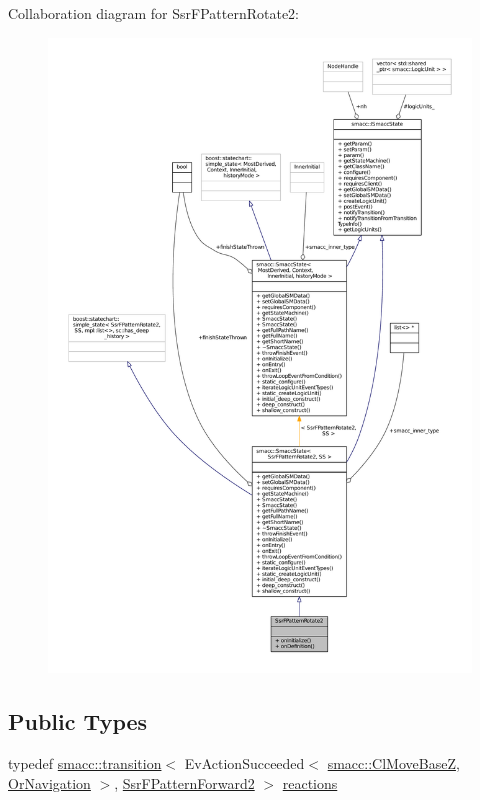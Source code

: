 Collaboration diagram for Ssr\+F\+Pattern\+Rotate2\+:
\nopagebreak
\begin{figure}[H]
\begin{center}
\leavevmode
\includegraphics[width=350pt]{structSsrFPatternRotate2__coll__graph}
\end{center}
\end{figure}
\subsection*{Public Types}
\begin{DoxyCompactItemize}
\item 
typedef \hyperlink{classsmacc_1_1transition}{smacc\+::transition}$<$ Ev\+Action\+Succeeded$<$ \hyperlink{classsmacc_1_1ClMoveBaseZ}{smacc\+::\+Cl\+Move\+BaseZ}, \hyperlink{classOrNavigation}{Or\+Navigation} $>$, \hyperlink{structSsrFPatternForward2}{Ssr\+F\+Pattern\+Forward2} $>$ \hyperlink{structSsrFPatternRotate2_a7415aa59cf273cef36f62fe1a796bb48}{reactions}
\end{DoxyCompactItemize}
